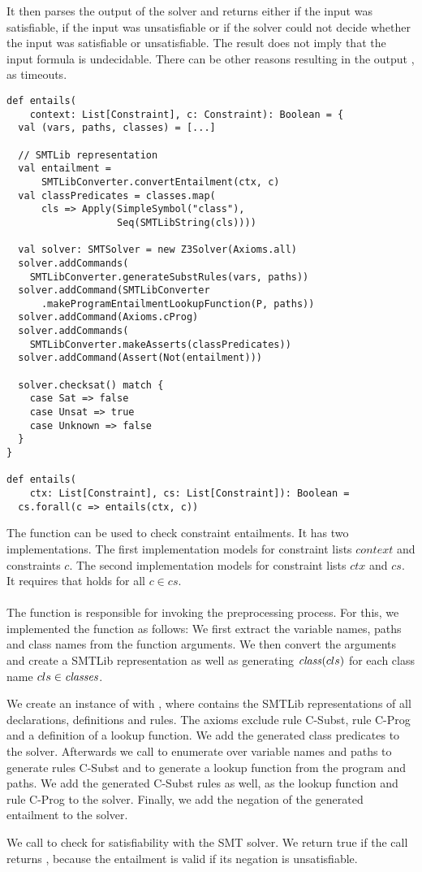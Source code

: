 It then parses the output of the solver
and returns either
 if the input was satisfiable,
 if the input was unsatisfiable or
 if the solver could not decide
whether the input was satisfiable or unsatisfiable.
The result  does not imply
that the input formula is undecidable.
There can be other reasons resulting
in the output , as timeouts.
%
\begin{lstlisting}[caption={Entailment Function},label=lst:entails,captionpos=b,frame={lines}]
def entails(
    context: List[Constraint], c: Constraint): Boolean = {
  val (vars, paths, classes) = [...]

  // SMTLib representation
  val entailment =
      SMTLibConverter.convertEntailment(ctx, c)
  val classPredicates = classes.map(
      cls => Apply(SimpleSymbol("class"),
                   Seq(SMTLibString(cls))))

  val solver: SMTSolver = new Z3Solver(Axioms.all)
  solver.addCommands(
    SMTLibConverter.generateSubstRules(vars, paths))
  solver.addCommand(SMTLibConverter
      .makeProgramEntailmentLookupFunction(P, paths))
  solver.addCommand(Axioms.cProg)
  solver.addCommands(
    SMTLibConverter.makeAsserts(classPredicates))
  solver.addCommand(Assert(Not(entailment)))

  solver.checksat() match {
    case Sat => false
    case Unsat => true
    case Unknown => false
  }
}

def entails(
    ctx: List[Constraint], cs: List[Constraint]): Boolean =
  cs.forall(c => entails(ctx, c))
\end{lstlisting}
%
The function  can be used
to check constraint entailments.
It has two implementations.
The first implementation models 
for constraint lists $context$ and constraints $c$.
The second implementation models 
for constraint lists $ctx$ and $cs$.
It requires that  holds for
all $c \in cs$.\\
\\
The function is responsible for
invoking the preprocessing process.
For this, we implemented the function as follows:
We first extract the variable names, paths
and class names from the function arguments.
We then convert the arguments and create
a SMTLib representation 
as well as generating $\mathit{class}(cls)$
for each class name $cls \in \mathit{classes}$.

We create an instance of 
with , where 
contains the SMTLib representations of all
declarations, definitions and rules.
The axioms exclude rule C-Subst, rule C-Prog
and a definition of a lookup function.
We add the generated class predicates to the solver.
Afterwards we call 
to enumerate over variable names and paths to
generate rules C-Subst
and 
to generate a lookup function from the program and paths.
We add the generated C-Subst rules as well,
as the lookup function and rule C-Prog to the solver.
Finally, we add the negation of the generated
entailment  to the solver.

We call  to check
for satisfiability with the SMT solver.
We return true if the call returns ,
because the entailment 
is valid if its negation is unsatisfiable.

